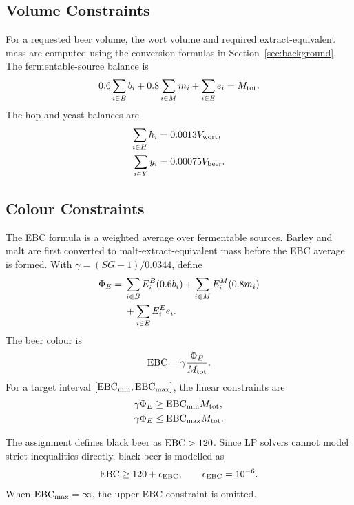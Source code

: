 \subsection{Volume Constraints}
\label{sec:volume-constraints}

For a requested beer volume, the wort volume and required extract-equivalent mass are computed using the conversion formulas in Section~\ref{sec:background}. The fermentable-source balance is
\begin{equation}
  0.6\sum_{i \in B}b_i
  +0.8\sum_{i \in M}m_i
  +\sum_{i \in E}e_i
  = M_{\mathrm{tot}}.
  \label{eq:malt-source-balance}
\end{equation}
The hop and yeast balances are
\begin{align}
  \sum_{i \in H}h_i &= 0.0013V_{\mathrm{wort}}, \label{eq:hop-balance}\\
  \sum_{i \in Y}y_i &= 0.00075V_{\mathrm{beer}}. \label{eq:yeast-balance}
\end{align}

\subsection{Colour Constraints}
\label{sec:colour-constraints}

The EBC formula is a weighted average over fermentable sources. Barley and malt are first converted to malt-extract-equivalent mass before the EBC average is formed. With $\gamma=(SG-1)/0.0344$, define
\begin{align}
  \Phi_E ={}&
    \sum_{i \in B} E^B_i(0.6b_i)
    +\sum_{i \in M} E^M_i(0.8m_i) \notag\\
  &+\sum_{i \in E} E^E_i e_i.
  \label{eq:ebc-contribution}
\end{align}
The beer colour is
\begin{equation}
  \mathrm{EBC} = \gamma\frac{\Phi_E}{M_{\mathrm{tot}}}.
  \label{eq:ebc-average}
\end{equation}
For a target interval $[\mathrm{EBC}_{\min},\mathrm{EBC}_{\max}]$, the linear constraints are
\begin{align}
  \gamma\Phi_E &\geq \mathrm{EBC}_{\min}M_{\mathrm{tot}}, \label{eq:ebc-lower}\\
  \gamma\Phi_E &\leq \mathrm{EBC}_{\max}M_{\mathrm{tot}}. \label{eq:ebc-upper}
\end{align}

The assignment defines black beer as $\mathrm{EBC}>120$. Since LP solvers cannot model strict inequalities directly, black beer is modelled as
\[
  \mathrm{EBC} \geq 120+\epsilon_{\mathrm{EBC}}, \qquad \epsilon_{\mathrm{EBC}}=10^{-6}.
\]
When $\mathrm{EBC}_{\max}=\infty$, the upper EBC constraint is omitted.

